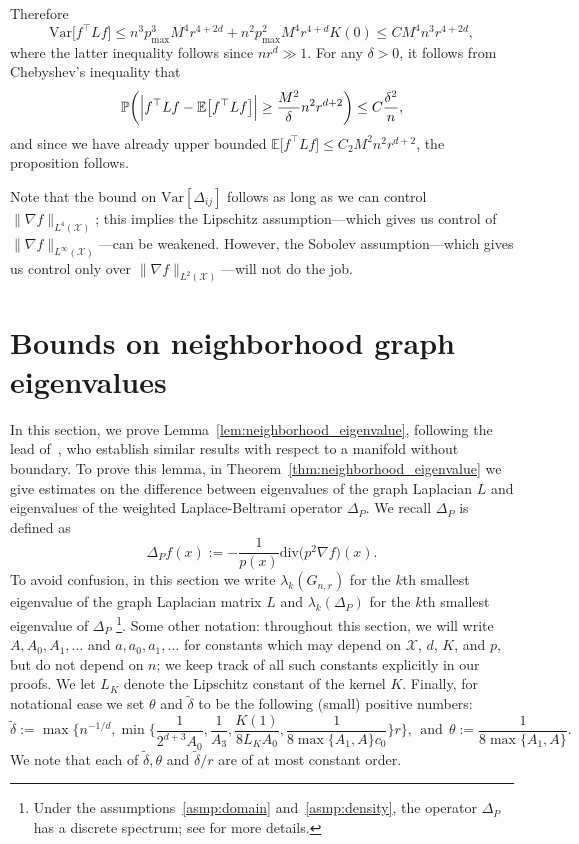 \documentclass[twoside]{article}
\newcommand{\Var}{\mathrm{Var}}
\newcommand{\1}{\mathbf{1}}
\newcommand{\Xset}{\mathcal{X}}
\newcommand{\Leb}{L}
\newcommand{\Pbb}{\mathbb{P}}
\newcommand{\Ebb}{\mathbb{E}}
\newcommand{\dive}{\mathrm{div}}
\newcommand{\wt}[1]{\widetilde{#1}}
\theoremstyle{definition}
\theoremstyle{remark}
\begin{document}
Therefore
\begin{equation*}
\Var\bigl[f^{\top} L f\bigr] \leq n^3 p_{\max}^3 M^4 r^{4 + 2d} + n^2 p_{\max}^2 M^4 r^{4 + d} K(0) \leq C M^4 n^3r^{4 + 2d},
\end{equation*}
where the latter inequality follows since $nr^d \gg 1$. For any $\delta > 0$, it follows from Chebyshev's inequality that
\begin{equation*}
\Pbb\biggl(\Bigl|f^{\top} L f - \Ebb\bigl[f^{\top} L f\bigr]\Bigr| \geq \frac{M^2}{\delta}n^2 r^{d + 2}\biggr) \leq C\frac{\delta^2}{n},
\end{equation*}
and since we have already upper bounded $\Ebb\bigl[f^{\top} L f\bigr] \leq C_2 M^2 n^2 r^{d + 2}$, the proposition follows. 

Note that the bound on $\Var[\varDelta_{i j}]$ follows as long as we can control $\|\nabla f\|_{\Leb^4(\Xset)}$; this implies the Lipschitz assumption---which gives us control of $\|\nabla f\|_{\Leb^{\infty}(\Xset)}$---can be weakened. However, the Sobolev assumption---which gives us control only over $\|\nabla f\|_{\Leb^2(\Xset)}$---will not do the job. 

\section{Bounds on neighborhood graph eigenvalues}
\label{sec:graph_eigenvalues}

In this section, we prove Lemma~\ref{lem:neighborhood_eigenvalue}, following the lead of~\citet{burago2014,trillos2019,calder2019}, who establish similar results with respect to a manifold without boundary. To prove this lemma, in  Theorem~\ref{thm:neighborhood_eigenvalue} we give estimates on the difference between eigenvalues of the graph Laplacian $L$ and eigenvalues of the weighted Laplace-Beltrami operator $\Delta_P$. We recall $\Delta_P$ is defined as
\begin{equation*}
\Delta_Pf(x) := -\frac{1}{p(x)} \dive\bigl(p^2\nabla f\bigr)(x).
\end{equation*}
To avoid confusion, in this section we write $\lambda_k(G_{n,r})$ for the $k$th smallest eigenvalue of the graph Laplacian matrix $L$ and $\lambda_k(\Delta_P)$ for the $k$th smallest eigenvalue of $\Delta_P$ \footnote{Under the assumptions~\ref{asmp:domain} and~\ref{asmp:density}, the operator $\Delta_P$ has a discrete spectrum; see \citet{garciatrillos18} for more details.}. Some other notation: throughout this section, we will write $A, A_0, A_1,\ldots$ and $a,a_0,a_1,\ldots$ for constants which may depend on $\Xset$, $d$, $K$, and $p$, but do not depend on $n$; we keep track of all such constants explicitly in our proofs. We let $L_K$ denote the Lipschitz constant of the kernel $K$. Finally, for notational ease we set $\theta$ and $\wt{\delta}$ to be the following (small) positive numbers:
\begin{equation}
\label{asmp:smallness}
\wt{\delta} := \max\Biggl\{n^{-1/d}, \min\biggl\{\frac{1}{2^{d + 3}A_0}, \frac{1}{A_3}, \frac{K(1)}{8L_KA_0}, \frac{1}{8\max\{A_1,A\}c_0}\biggr\}r\Biggr\},~~\textrm{and}~~
\theta := \frac{1}{8\max\{A_1,A\}}.
\end{equation} 
We note that each of $\wt{\delta}, \theta$ and $\wt{\delta}/r$ are of at most constant order. 
\end{document}
